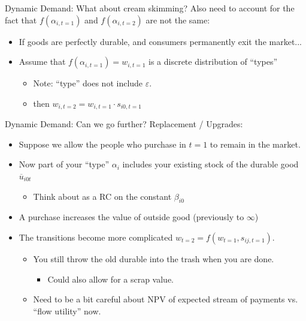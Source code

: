 \documentclass[xcolor=pdftex,dvipsnames,table,mathserif,aspectratio=169]{beamer}
\begin{document}
\begin{frame}{Dynamic Demand: What about cream skimming?}
Also need to account for the fact that $f(\alpha_{i,t=1})$ and $f(\alpha_{i,t=2})$  are not the same:
\begin{itemize}
\item If goods are perfectly durable, and consumers permanently exit the market...
\item Assume that $f(\alpha_{i,t=1}) = w_{i,t=1}$ is a discrete distribution of ``types''
\begin{itemize}
\item Note: ``type'' does not include $\varepsilon$.
\item then $w_{i,t=2} = w_{i,t=1} \cdot s_{i0,t=1}$
\end{itemize}
\end{itemize}
\end{frame}




\begin{frame}{Dynamic Demand: Can we go further?}
Replacement / Upgrades:
\begin{itemize}
\item Suppose we allow the people who purchase in $t=1$ to remain in the market.
\item Now part of your ``type'' $\alpha_i$ includes your existing stock of the durable good $\overline{u}_{i0t}$
\begin{itemize}
\item Think about as a RC on the constant $\beta_{i0}$
\end{itemize}
\item A purchase increases the value of outside good (previously to $\infty$)
\item The transitions become more complicated $w_{t=2} = f(w_{t=1},s_{ij,t=1})$.
\begin{itemize}
\item You still throw the old durable into the trash when you are done.
\begin{itemize}
\item Could also allow for a scrap value.
\end{itemize}
\item Need to be a bit careful about NPV of expected stream of payments vs. ``flow utility'' now.
\end{itemize}
\end{itemize}
\end{frame}
\end{document}
